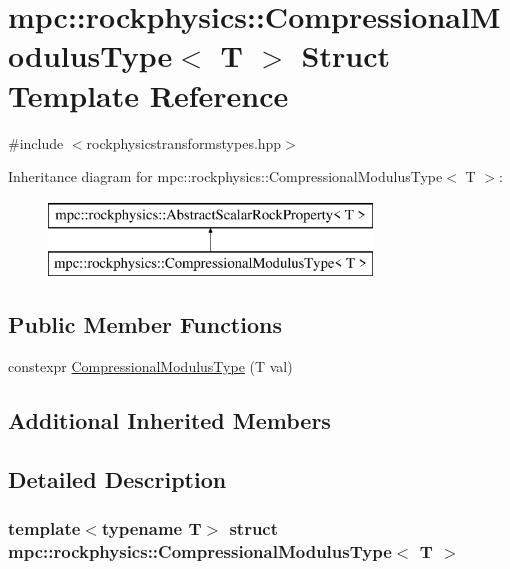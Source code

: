 \hypertarget{structmpc_1_1rockphysics_1_1_compressional_modulus_type}{}\section{mpc\+:\+:rockphysics\+:\+:Compressional\+Modulus\+Type$<$ T $>$ Struct Template Reference}
\label{structmpc_1_1rockphysics_1_1_compressional_modulus_type}


{\ttfamily \#include $<$rockphysicstransformstypes.\+hpp$>$}

Inheritance diagram for mpc\+:\+:rockphysics\+:\+:Compressional\+Modulus\+Type$<$ T $>$\+:\begin{figure}[H]
\begin{center}
\leavevmode
\includegraphics[height=2.000000cm]{structmpc_1_1rockphysics_1_1_compressional_modulus_type}
\end{center}
\end{figure}
\subsection*{Public Member Functions}
\begin{DoxyCompactItemize}
\item 
constexpr \mbox{\hyperlink{structmpc_1_1rockphysics_1_1_compressional_modulus_type_abdc02663a7781e7aa90f198d165901a9}{Compressional\+Modulus\+Type}} (T val)
\end{DoxyCompactItemize}
\subsection*{Additional Inherited Members}


\subsection{Detailed Description}
\subsubsection*{template$<$typename T$>$\newline
struct mpc\+::rockphysics\+::\+Compressional\+Modulus\+Type$<$ T $>$}



